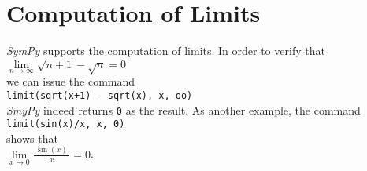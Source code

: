\documentclass{report}
\newcommand{\bruch}[2]{\displaystyle\frac{\;\displaystyle#1\;}{\;\displaystyle#2\;}}
\begin{document}
\section{Computation of Limits}
\textsl{SymPy} supports the computation of limits.  In order to verify that 
\\[0.2cm]
\hspace*{1.3cm}
$\lim\limits_{n \rightarrow \infty} \sqrt{n+1} - \sqrt{n} = 0$
\\[0.2cm]
we can issue the command
\\[0.2cm]
\hspace*{1.3cm}
\texttt{limit(sqrt(x+1) - sqrt(x), x, oo)}
\\[0.2cm]
\textsl{SmyPy} indeed returns \texttt{0} as the result.  As another example, the command
\\[0.2cm]
\hspace*{1.3cm}
\texttt{limit(sin(x)/x, x, 0)}
\\[0.2cm]
shows that
\\[0.2cm]
\hspace*{1.3cm}
$\lim\limits_{x \rightarrow 0} \bruch{\sin(x)}{x} = 0$.
\end{document}
